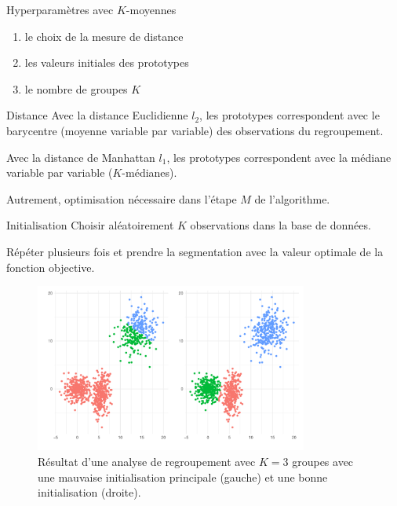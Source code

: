 \documentclass[
  ignorenonframetext,
]{beamer}
\providecommand{\tightlist}{%
  \setlength{\itemsep}{0pt}\setlength{\parskip}{0pt}}\usepackage{longtable,booktabs,array}
\begin{document}
\begin{frame}{Hyperparamètres avec \(K\)-moyennes}
\protect\hypertarget{hyperparamuxe8tres-avec-k-moyennes}{}
\begin{enumerate}
\tightlist
\item
  le choix de la mesure de distance
\item
  les valeurs initiales des prototypes
\item
  le nombre de groupes \(K\)
\end{enumerate}
\end{frame}

\begin{frame}{Distance}
\protect\hypertarget{distance}{}
Avec la distance Euclidienne \(l_2\), les prototypes correspondent avec
le barycentre (moyenne variable par variable) des observations du
regroupement.

Avec la distance de Manhattan \(l_1\), les prototypes correspondent avec
la médiane variable par variable (\(K\)-médianes).

Autrement, optimisation nécessaire dans l'étape \(M\) de l'algorithme.
\end{frame}

\begin{frame}{Initialisation}
\protect\hypertarget{initialisation}{}
Choisir aléatoirement \(K\) observations dans la base de données.

Répéter plusieurs fois et prendre la segmentation avec la valeur
optimale de la fonction objective.

\begin{figure}

{\centering \includegraphics[width=0.8\textwidth,height=\textheight]{MATH60602-diapos11_files/figure-beamer/fig-kmoyenne-mauvais-1.pdf}

}

\caption{\label{fig-kmoyenne-mauvais}Résultat d'une analyse de
regroupement avec \(K=3\) groupes avec une mauvaise initialisation
principale (gauche) et une bonne initialisation (droite).}

\end{figure}
\end{frame}
\end{document}
